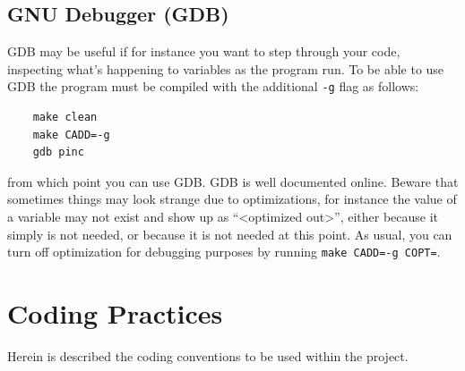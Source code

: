 \documentclass[10pt,a4paper]{article}
\begin{document}
\subsection{GNU Debugger (GDB)}
GDB may be useful if for instance you want to step through your code, inspecting what's happening to variables as the program run. To be able to use GDB the program must be compiled with the additional \verb$-g$ flag as follows:

\begin{verbatim}
	make clean
	make CADD=-g
	gdb pinc
\end{verbatim}
from which point you can use GDB. GDB is well documented online. Beware that sometimes things may look strange due to optimizations, for instance the value of a variable may not exist and show up as ``<optimized out>'', either because it simply is not needed, or because it is not needed at this point. As usual, you can turn off optimization for debugging purposes by running \verb$make CADD=-g COPT=$.

\section{Coding Practices}
Herein is described the coding conventions to be used within the project.
\end{document}
